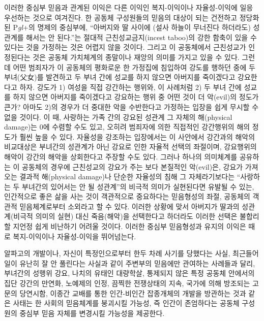 이러한 중심부 믿음과 관계된 이익은 다른 이익인 복지-이익이나 자율성-이익에 일응 우선하는 것으로 여겨진다. 한 공동체 구성원들의 믿음의 대상이 되는 건전하고 정당화된 P\emph{gl}+의 명제의 중심부에, ``아버지와 딸 사이에 (설사 하늘이 무너진다 하더라도) 성관계를 해서는 안 된다.''는 절대적 근친성교금지(incest taboo)의 강한 함축이 있을 수 있다는 것을 가정하는 것은 어렵지 않을 것이다. 그리고 이 공동체에서 근친성교가 인정된다는 것은 공동체 가치체계의 종말이나 재앙의 의미를 가지고 있을 수 있다. 그런데 어떤 범죄자가 이 공동체의 평화로운 한 가정집에 침입하여 강도를 행하던 중에 두 부녀(父女)를 발견하고 두 부녀 간에 성교를 하지 않으면 아버지를 죽이겠다고 강요한다고 하자. 강도가 1) 여성을 직접 강간하는 행위와, 이 사례처럼 2) 두 부녀 간에 성교를 하지 않으면 아버지를 죽이겠다고 강요하는 행위 중 어떤 것이 더 악(evil)의 정도가 큰가? 아마도 2)의 경우가 더 중대한 악을 수반한다고 가정하는 입장을 쉽게 무시할 수 없을 것이다. 이 때, 사랑하는 가족 간의 강요된 성관계 그 자체의 해(physical damage)는 0에 수렴할 수도 있고, 오히려 범죄자에 의한 직접적인 강간행위의 해의 정도가 훨씬 높을 수 있다. 자율성을 강조하는 입장에서는 이 사안에서 강간과의 해악의 비교대상은 부녀간의 성관계가 아닌 강요로 인한 자율적 선택의 좌절이며, 강요행위의 해악이 강간의 해악을 상회한다고 주장할 수도 있다. 그러나 하나의 의미체계를 공유하는 이 공동체의 경우에 근친성교의 강요가 주는 보다 본질적인 악(evil)은, 강요가 가져오는 결과적 해(physical damage)나 단순한 자율성의 침해 그 자체라기보다는 ``사랑하는 두 부녀간의 있어서는 안 될 성관계''의 비극적 의미가 실현된다면 유발될 수 있는, 인간적으로 좋은 삶을 사는 것이 객관적으로 중요하다는 믿음형성의 좌절, 공동체의 객관적 믿음체계로부터 소외라고 할 수 있다. 이러한 상황에 맞서 아버지가 딸과의 성관계(비극적 의미의 실현) 대신 죽음(해악)을 선택한다고 하더라도 이러한 선택은 불합리할 지언정 쉽게 비난하기 어려울 것이다. 이러한 중심부 믿음형성과 유지의 이익은 때로 복지-이익이나 자율성-이익을 뛰어넘는다.

알파고의 개발이나, 자신이 특정인으로부터 한두 차례 사기를 당했다는 사실, 최근들어 일이 유난히 잘 안 풀린다는 사실과 같이 주변부의 믿음에만 관여하는 사례들과 달리, 부녀간의 성행위 강요, 나치의 유태인 대량학살, 통제되지 않은 특정 공동체 안에서의 집단 강간의 만연화, 노예제의 인정, 끔찍한 전쟁상태의 지속, 국가에 의해 방조되는 고문의 당연시함, 이종간 교배를 통한 인간-비인간 잡종개체의 개발을 방관하는 것과 같은 사태는 한 사회의 믿음체계를 붕괴시킬 가능성, 즉 인간이 존엄하다는 공동체 구성원의 중심부 믿음 자체를 변경시킬 가능성을 제공한다.

